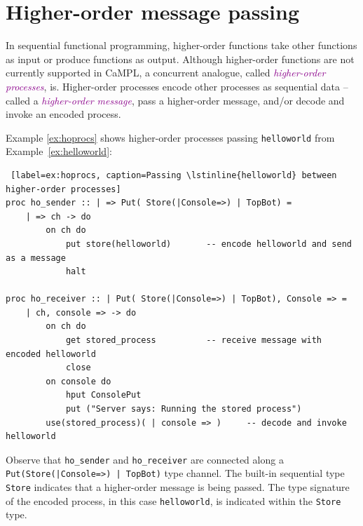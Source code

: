 \documentclass[11pt]{article}
\newcommand{\tc}[1]{\textcolor{darkMagenta}{\textit{#1}}}
\begin{document}
\section{Higher-order message passing}
\label{sec:homsgs}

In sequential functional programming, higher-order functions take other functions as input or produce functions as output. 
Although higher-order functions are not currently supported in CaMPL, a concurrent analogue, called \tc{higher-order processes}, is.
Higher-order processes encode other processes as sequential data -- called a \tc{higher-order message}, pass a higher-order message, and/or decode and invoke an encoded process.

Example \ref{ex:hoprocs} shows higher-order processes passing \lstinline$helloworld$ from Example~\ref{ex:helloworld}:
\begin{lstlisting} [label=ex:hoprocs, caption=Passing \lstinline{helloworld} between higher-order processes]
proc ho_sender :: | => Put( Store(|Console=>) | TopBot) =
	| => ch -> do
		on ch do
			put store(helloworld)		-- encode helloworld and send as a message
			halt
			
proc ho_receiver :: | Put( Store(|Console=>) | TopBot), Console => =
	| ch, console => -> do
		on ch do
			get stored_process			-- receive message with encoded helloworld
			close
		on console do
			hput ConsolePut
			put ("Server says: Running the stored process")
		use(stored_process)( | console => )		-- decode and invoke helloworld
\end{lstlisting}
Observe that \lstinline$ho_sender$ and \lstinline$ho_receiver$ are connected along a \lstinline$Put(Store(|Console=>) | TopBot)$ type channel.
The built-in sequential type \lstinline$Store$ indicates that a higher-order message is being passed.
The type signature of the encoded process, in this case \lstinline$helloworld$, is indicated within the \lstinline$Store$ type.
\end{document}
